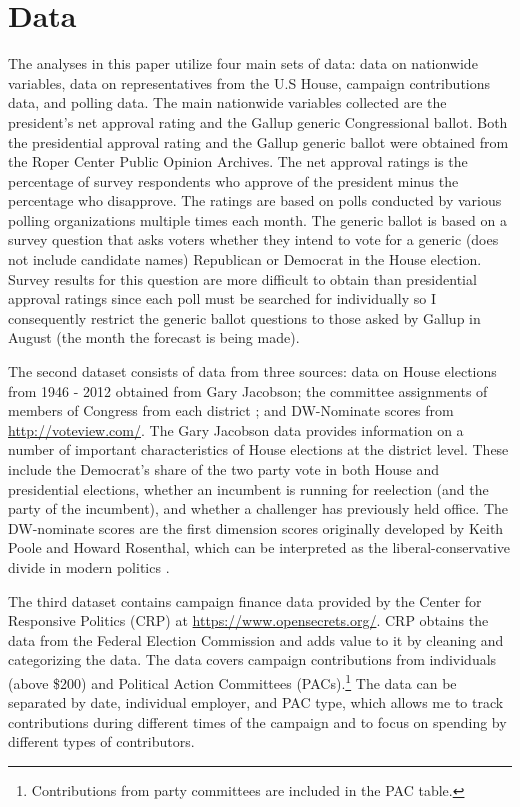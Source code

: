 \documentclass[12pt,final,fleqn]{article}
\theoremstyle{plain}
\begin{document}
\section{Data}
The analyses in this paper utilize four main sets of data: data on nationwide variables, data on representatives from the U.S House, campaign contributions data, and polling data. The main nationwide variables collected are the president's net approval rating and the Gallup generic Congressional ballot. Both the presidential approval rating and the Gallup generic ballot were obtained from the Roper Center Public Opinion Archives. The net approval ratings is the percentage of survey respondents who approve of the president minus the percentage who disapprove. The ratings are based on polls conducted by various polling organizations multiple times each month. The generic ballot is based on a survey question that asks voters whether they intend to vote for a generic (does not include candidate names) Republican or Democrat in the House election. Survey results for this question are more difficult to obtain than presidential approval ratings since each poll must be searched for individually so I consequently restrict the generic ballot questions to those asked by Gallup in August (the month the forecast is being made).

The second dataset consists of data from three sources: data on  House elections from 1946 - 2012 obtained from Gary Jacobson; the committee assignments of members of Congress from each district \citep{stewart2015}; and DW-Nominate scores from \url{http://voteview.com/}. The Gary Jacobson data provides information on a number of important characteristics of House elections at the district level. These include the Democrat's share of the two party vote in both House and presidential elections, whether an incumbent is running for reelection (and the party of the incumbent), and whether a challenger has previously held office. The DW-nominate scores are the first dimension scores originally developed by Keith Poole and Howard Rosenthal, which can be interpreted as the liberal-conservative divide in modern politics \citep{poole1997congress, poole2011ideology}.

The third dataset contains campaign finance data provided by the Center for Responsive Politics (CRP) at \url{https://www.opensecrets.org/}. CRP obtains the data from the Federal Election Commission and adds value to it by cleaning and categorizing the data. The data covers campaign contributions from individuals (above \$200) and Political Action Committees (PACs).\footnote{Contributions from party committees are included in the PAC table.} The data can be separated by date, individual employer, and PAC type, which allows me to track contributions during different times of the campaign and to focus on spending by different types of contributors. 
\end{document}

